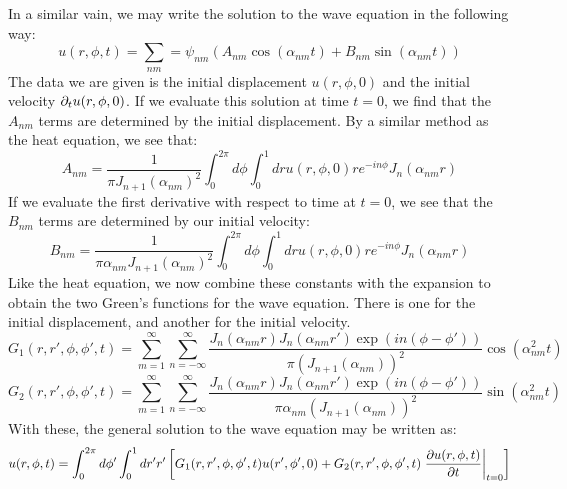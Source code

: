 \documentclass{article}
\begin{document}
In a similar vain, we may write the solution to the wave equation in the following way:
\begin{equation}
u(r,\phi,t) = \sum_{nm} = \psi_{nm}(A_{nm}\cos(\alpha_{nm} t)+B_{nm}\sin(\alpha_{nm}t))
\end{equation}
The data we are given is the initial displacement $u(r,\phi,0)$ and the initial velocity $\partial_{t} u(r,\phi,0)$. If we evaluate this solution at time $t=0$, we find that the $A_{nm}$ terms are determined by the initial displacement. By a similar method as the heat equation, we see that:
\begin{equation}
  A_{nm} = \frac{1}{\pi J_{n+1}(\alpha_{nm})^2}\int_0^{2\pi} d\phi\int_0^1 dr u(r,\phi,0) r e^{- i n \phi}J_n(\alpha_{nm} r)
\end{equation}
If we evaluate the first derivative with respect to time at $t=0$, we see that the $B_{nm}$ terms are determined by our initial velocity:
\begin{equation}
  B_{nm} = \frac{1}{\pi\alpha_{nm} J_{n+1}(\alpha_{nm})^2}\int_0^{2\pi} d\phi\int_0^1 dr u(r,\phi,0) r e^{- i n \phi}J_n(\alpha_{nm} r)
\end{equation}
Like the heat equation, we now combine these constants with the expansion to obtain the two Green's functions for the wave equation. There is one for the initial displacement, and another for the initial velocity.
\begin{equation}
  \boxed{
    \boxed{
      G_1(r,r',\phi,\phi',t) = \sum_{m = 1}^\infty \sum_{n = -\infty} ^\infty 
      \frac{J_n(\alpha_{nm} r) J_n(\alpha_{nm} r') \exp\left(i n(\phi - \phi')\right) }{\pi \left(J_{n+1}(\alpha_{nm})\right)^2}\cos\left(\alpha_{nm}^2 t\right)
    }
  }
\end{equation}
\begin{equation}
  \boxed{
    \boxed{
      G_2(r,r',\phi,\phi',t) = \sum_{m = 1}^\infty \sum_{n = -\infty} ^\infty 
      \frac{J_n(\alpha_{nm} r) J_n(\alpha_{nm} r') \exp\left(i n(\phi - \phi')\right) }{\pi \alpha_{nm}\left(J_{n+1}(\alpha_{nm})\right)^2}\sin\left(\alpha_{nm}^2 t\right)
    }
  }
\end{equation}
With these, the general solution to the wave equation may be written as:
\begin{equation}
  u(r,\phi,t) = \int_0^{2\pi} d\phi' \int_0^1 dr' r' \left[G_1(r,r',\phi,\phi',t) u(r',\phi',0)+ G_2(r,r',\phi,\phi',t) \left.\frac{\partial u(r,\phi,t)}{\partial t}\right|_{t=0}\right]
\end{equation}
\end{document}
